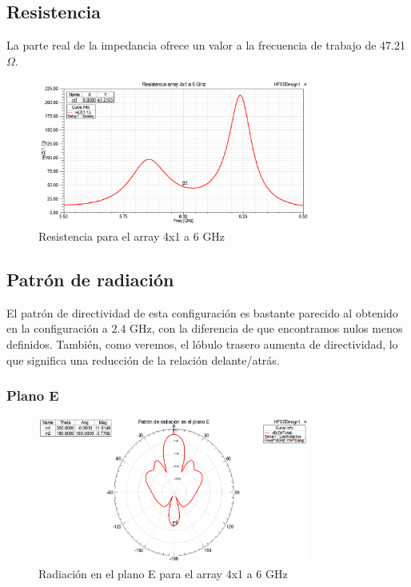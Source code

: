\subsection{Resistencia}
\par La parte real de la impedancia ofrece un valor a la frecuencia de trabajo de 47.21 $\Omega$.
\\
\begin{figure}[H]
    \centering
        \includegraphics[width=0.8\textwidth]{archivos/analisis/4x12/3}
        \caption{Resistencia para el array 4x1 a 6 GHz}
        \label{fig:resis4x12}
\end{figure}

\subsection{Patrón de radiación}
\par El patrón de directividad de esta configuración es bastante parecido al obtenido en la configuración a 2.4 GHz, con la diferencia de que encontramos nulos menos definidos. También, como veremos, el lóbulo trasero aumenta de directividad, lo que significa una reducción de la relación delante/atrás.
\\
\subsubsection{Plano E}
\begin{figure}[H]
    \centering
        \includegraphics[width=0.8\textwidth]{archivos/analisis/4x12/4}
        \caption{Radiación en el plano E para el array 4x1 a 6 GHz}
        \label{fig:E4x12}
\end{figure}

